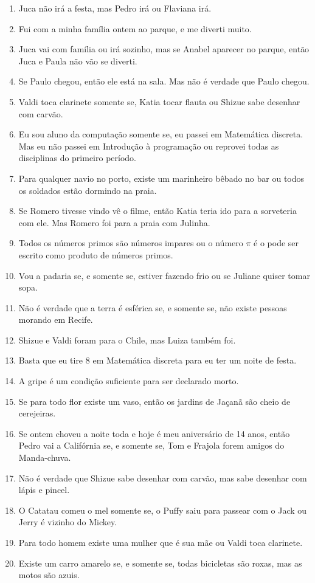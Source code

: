\begin{enumerate}
	\item Juca não irá a festa, mas Pedro irá ou Flaviana irá.
	\item Fui com a minha família ontem ao parque, e me diverti muito.
	\item Juca vai com família ou irá sozinho, mas se Anabel aparecer no parque, então Juca e Paula não vão se diverti.
	\item Se Paulo chegou, então ele está na sala. Mas não é verdade que Paulo chegou.
	\item Valdi toca clarinete somente se, Katia tocar flauta ou Shizue sabe desenhar com carvão.
	\item Eu sou aluno da computação somente se, eu passei em Matemática discreta. Mas eu não passei em Introdução à programação ou reprovei todas as disciplinas do primeiro período.
	\item Para qualquer navio no porto, existe um marinheiro bêbado no bar ou todos os soldados estão dormindo na praia.
	\item Se Romero tivesse vindo vê o filme, então Katia teria ido para a sorveteria com ele. Mas Romero foi para a praia com Julinha.
	\item Todos os números primos são números impares ou o número $\pi$ é o pode ser escrito como produto de números primos.
	\item Vou a padaria se, e somente se, estiver fazendo frio ou se Juliane quiser tomar sopa.
	\item Não é verdade que a terra é esférica se, e somente se, não existe pessoas morando em Recife.
	\item Shizue e Valdi foram para o Chile, mas Luiza também foi.
	\item Basta que eu tire 8 em Matemática discreta para eu ter um noite de festa.
	\item A gripe é um condição suficiente para ser declarado morto.
	\item Se para todo flor existe um vaso, então os jardins de Jaçanã são cheio de cerejeiras. 
	\item Se ontem choveu a noite toda e hoje é meu aniversário de 14 anos, então Pedro vai a Califórnia se, e somente se, Tom e Frajola forem amigos do Manda-chuva.
	\item Não é verdade que Shizue sabe desenhar com carvão, mas sabe desenhar com lápis e pincel.
	\item O Catatau comeu o mel somente se, o Puffy saiu para passear com o Jack ou Jerry é vizinho do Mickey.
	\item Para todo homem existe uma mulher que é sua mãe ou Valdi toca clarinete.
	\item Existe um carro amarelo se, e somente se, todas bicicletas são roxas, mas as motos são azuis. 
\end{enumerate}